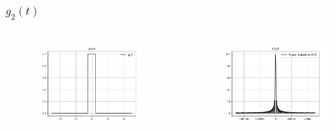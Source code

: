 \documentclass{beamer}
\begin{document}
\begin{frame}
  \frametitle{$g_2(t)$}
 \begin{columns}
\begin{column}{0.5\textwidth}
\begin{figure}
\begin{flushleft}
\includegraphics[width=\columnwidth]{graphs/g3.png}

\end{flushleft}
\end{figure}
\end{column}
\begin{column}{0.5\textwidth}
\begin{figure}
\begin{flushleft}
\includegraphics[width=\columnwidth]{graphs/fourier_g3.png}

\end{flushleft}
\end{figure}
\end{column}
\end{columns}
\end{frame}
\end{document}
